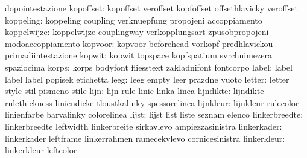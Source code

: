                            dopointestazione
                kopoffset: kopoffset                 veroffset
                           kopfoffset                offsethlavicky
                           veroffset                 %
                koppeling: koppeling                 coupling
                           verknuepfung              propojeni
                           accoppiamento
              koppelwijze: koppelwijze               couplingway
                           verkopplungsart           zpusobpropojeni
                           modoaccoppiamento
                  kopvoor: kopvoor                   beforehead
                           vorkopf                   predhlavickou
                           primadiintestazione
                   kopwit: kopwit                    topspace
                           kopfspatium               svrchnimezera
                           spaziocima
                    korps: korps                     bodyfont
                           fliesstext                zakladnifont
                           fontcorpo
                    label: label                     label
                           label                     popisek
                           etichetta
                     leeg: leeg                      empty
                           leer                      prazdne
                           vuoto
                   letter: letter                    style
                           stil                      pismeno
                           stile
                     lijn: lijn                      rule
                           linie                     linka
                           linea
                lijndikte: lijndikte                 rulethickness
                           liniendicke               tloustkalinky
                           spessorelinea
                lijnkleur: lijnkleur                 rulecolor
                           linienfarbe               barvalinky
                           colorelinea
                    lijst: lijst                     list
                           liste                     seznam
                           elenco
            linkerbreedte: linkerbreedte             leftwidth
                           linkerbreite              sirkavlevo
                           ampiezzasinistra
              linkerkader: linkerkader               leftframe
                           linkerrahmen              ramecekvlevo
                           cornicesinistra
              linkerkleur: linkerkleur               leftcolor
